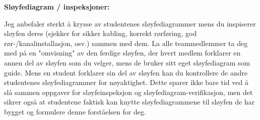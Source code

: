 \vskip 10pt














\noindent
{\bf Sløyfediagram / inspeksjoner:}

Jeg anbefaler sterkt å krysse av studentenes sløyfediagrammer mens du inspiserer sløyfen deres (sjekker for sikker kabling, korrekt rørføring, god rør-/kanalinstallasjon, osv.) sammen med dem.  La alle teammedlemmer ta deg med på en "omvisning" av den ferdige sløyfen, der hvert medlem forklarer en annen del av sløyfen som du velger, mens de bruker sitt eget sløyfediagram som guide.  Mens en student forklarer sin del av sløyfen kan du kontrollere de andre studentenes sløyfediagrammer for nøyaktighet.  Dette sparer ikke bare tid ved å slå sammen oppgaver for sløyfeinspeksjon og sløyfediagram-verifikasjon, men det sikrer også at studentene faktisk kan knytte sløyfediagrammene til sløyfen de har bygget og formulere denne forståelsen for deg.


